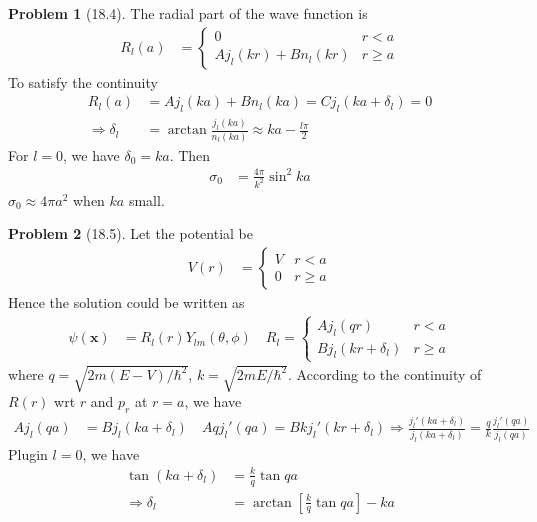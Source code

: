 \documentclass[twoside,11pt]{article}
\theoremstyle{definition}
\newtheorem{problem}{Problem}
\theoremstyle{remark}
\begin{document}
\begin{problem}[18.4]
The radial part of the wave function is
\begin{align*}
    R_l(a) &= \begin{cases}
        0 & r < a\\
        Aj_l(kr) + Bn_l(kr) & r \geq a
    \end{cases}
\end{align*}
To satisfy the continuity
\begin{align*}
    R_l(a) &= A j_l(ka) + B n_l(ka) = C j_l(ka+\delta_l) = 0\\
    \Rightarrow
    \delta_l &= \arctan \frac{j_l(ka)}{n_l(ka)} \approx
    ka - \frac{l\pi}{2}
\end{align*}
For $l=0$, we have $\delta_0=ka$.
Then 
\begin{align*}
    \sigma_0 &= \frac{4\pi}{k^2}\sin^2 ka
\end{align*}
$\sigma_0\approx 4\pi a^2$ when $ka$ small.
\end{problem}



\begin{problem}[18.5]
Let the potential be
\begin{align*}
    V(r) &= \begin{cases}
        V & r < a\\
        0 & r\geq a
    \end{cases}
\end{align*}
Hence the solution could be written as
\begin{align*}
    \psi(\mathbf{x}) &= R_l(r)Y_{lm}(\theta,\phi)\quad
    R_l = \begin{cases}
        Aj_l(qr) & r < a\\
        Bj_l(kr+\delta_l) & r \geq a
    \end{cases}
\end{align*}
where $q=\sqrt{2m(E-V)/\hbar^2}$, $k=\sqrt{2mE/\hbar^2}$.
According to the continuity of $R(r)$ wrt $r$ and $p_r$ at $r=a$, we have
\begin{align*}
    Aj_l(qa) &= Bj_l(ka+\delta_l)\quad 
    Aqj_l'(qa) = Bkj_l'(kr+\delta_l)
    \Rightarrow
    \frac{j_l'(ka+\delta_l)}{j_l(ka+\delta_l)} = 
    \frac{q}{k}\frac{j_l'(qa)}{j_l(qa)}
\end{align*}
Plugin $l=0$, we have
\begin{align*}
    \tan(ka+\delta_l) &= \frac{k}{q}\tan qa\\
    \Rightarrow \delta_l &= 
    \arctan\left[
        \frac{k}{q}\tan qa
    \right] - ka
\end{align*}

\end{problem}





\end{document}
